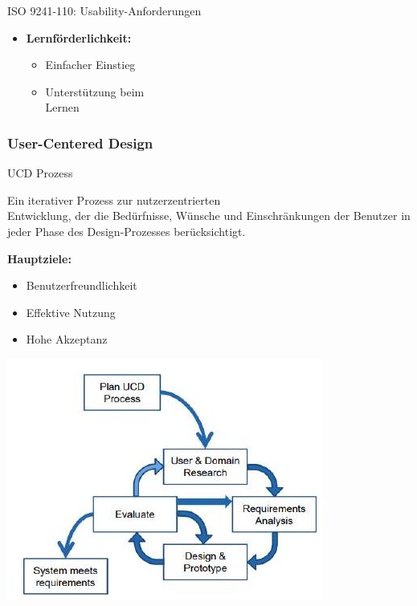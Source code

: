 \begin{theorem}{ISO 9241-110: Usability-Anforderungen}
\begin{minipage}[t]{0.4\linewidth}
\begin{itemize}
    \item \textbf{Lernförderlichkeit:}
    \begin{itemize}
        \item Einfacher Einstieg
        \item Unterstützung beim \\ Lernen
    \end{itemize}
\end{itemize}
\end{minipage}
\end{theorem}



\subsubsection{User-Centered Design}

\begin{concept}{UCD Prozess}

\begin{minipage}{0.4\linewidth}
Ein iterativer Prozess zur nutzerzentrierten \\ Entwicklung, der die Bedürfnisse, Wünsche und Einschränkungen 
der Benutzer in jeder Phase des Design-Prozesses berücksichtigt.

\textbf{Hauptziele:}
\begin{itemize}
    \item Benutzerfreundlichkeit
    \item Effektive Nutzung
    \item Hohe Akzeptanz
\end{itemize}
\end{minipage}
\begin{minipage}{0.6\linewidth}
    \vspace{-5mm}
    \includegraphics[width=\linewidth]{images/2024_12_29_0d1d7b5551ea1b4b41bdg-03}
\end{minipage}
\end{concept}

